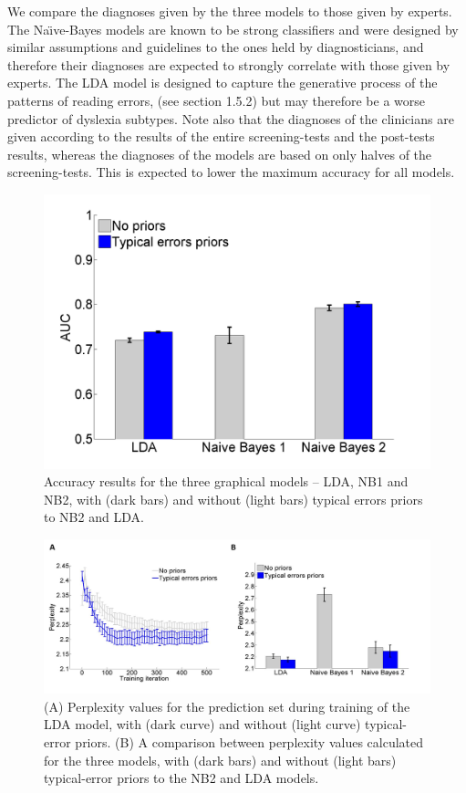 {{We compare the diagnoses given by the three models to those given by experts. The Na\"{\i}ve-Bayes models are known to be strong classifiers and were designed by similar assumptions and guidelines to the ones held by diagnosticians, and therefore their diagnoses are expected to strongly correlate with those given by experts. The LDA model is designed to capture the generative process of the patterns of reading errors, (see section 1.5.2) but may therefore be a worse predictor of dyslexia subtypes. 
Note also that the diagnoses of the clinicians are given according to the results of the entire screening-tests and the post-tests results, whereas the diagnoses of the models are based on only halves of the screening-tests. This is expected to lower the maximum accuracy for all models.

\begin{figure}[h]
\vspace{.3in}
\includegraphics[width=\linewidth]{Figures/Ch1/AUC}
\caption{Accuracy results for the three graphical models – LDA, NB1 and NB2, with (dark bars) and without (light bars) typical errors priors to NB2 and LDA.}
\vspace{.3in}
\end{figure}

\begin{figure}
\vspace{.3in}
\includegraphics[width=\textwidth]{Figures/Ch1/figure5AB_HOZ}
\caption{(A) Perplexity values for the prediction set during training of the LDA model, with (dark curve) and without (light curve) typical-error priors. (B) A comparison between perplexity values calculated for the three models, with (dark bars) and without (light bars) typical-error priors to the NB2 and LDA models.}
\vspace{.3in}
\end{figure}

}}

